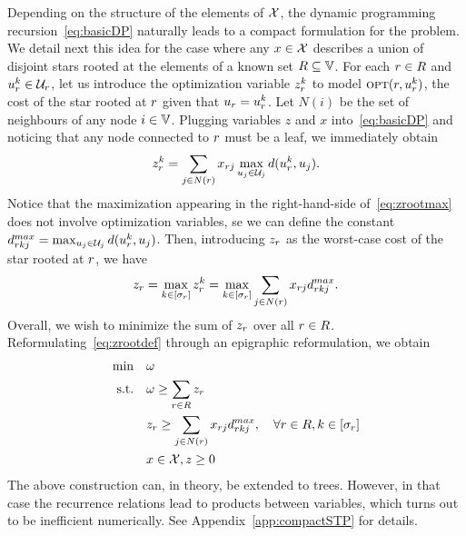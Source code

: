 \documentclass[12pt]{article}
\begin{document}
Depending on the structure of the elements of $\mathcal{X}$, the dynamic programming recursion~\eqref{eq:basicDP} naturally leads to a compact formulation for the problem. We detail next this idea for the case where any $x\in\mathcal{X}$ describes a union of disjoint stars rooted at the elements of a known set $R\subseteq \mathbb{V}$. 
For each $r\in R$ and $u_r^k\in\mathcal{U}_r$, let us introduce the optimization variable $z_{r}^k$ to model $\mbox{\textsc{opt}}(r,u_r^k)$, the cost of the star rooted at $r$ given that $u_r=u_r^k$.
Let $N(i)$ be the set of neighbours of any node $i\in\mathbb{V}$. Plugging variables $z$ and $x$ into~\eqref{eq:basicDP} and noticing that any node connected to $r$ must be a leaf, we immediately obtain
\begin{equation}
\label{eq:zrootmax}
 z_{r}^k = \sum\limits_{j \in N(r)} x_{r j} \max\limits_{u_j \in \mathcal{U}_j} d(u_r^k,u_j).
\end{equation}
Notice that the maximization appearing in the right-hand-side of~\eqref{eq:zrootmax} does not involve optimization variables, se we can define the constant $d^{max}_{r k j}=\max_{u_j \in \mathcal{U}_j} d(u_r^k,u_j)$. Then, introducing $z_r$ as the worst-case cost of the star rooted at $r$, we have
\begin{equation}
\label{eq:zrootdef}
z_{r} = \max\limits_{k\in [{\sigma_{r}}]}z_{r}^k = \max\limits_{k\in [{\sigma_{r}}]}\sum\limits_{j \in N(r)} x_{r j} d^{max}_{r k j}. 
\end{equation}
Overall, we wish to minimize the sum of $z_{r}$ over all $r\in R$.  Reformulating~\eqref{eq:zrootdef} through an epigraphic reformulation, we obtain
\begin{align}
\min\quad & \omega \nonumber\\
\mbox{s.t.}\quad & \omega \geq \sum_{r \in R} z_r \\
& z_r \geq \sum\limits_{j \in N(r)} x_{r j} d^{max}_{r k j}, \quad \forall r\in R, k\in [{\sigma_{r}}]\\
& x \in \mathcal{X}, z\geq 0\nonumber
\end{align}
The above construction can, in theory, be extended to trees. However, in that case the recurrence relations lead to products between variables, which turns out to be inefficient numerically. See Appendix~\ref{app:compactSTP} for details. 

\end{document}
